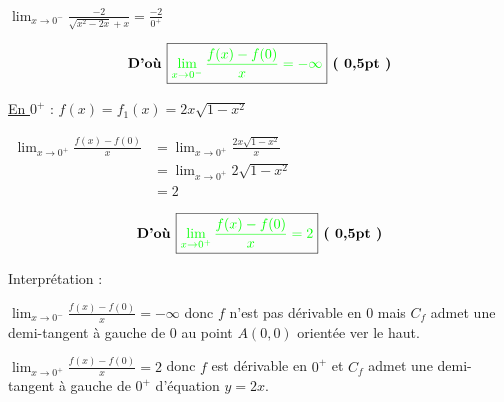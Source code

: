 \documentclass[12pt,a4paper]{article}
\begin{document}
\begin{enumerate}
$\lim_{x \to 0^{-}} \frac{ - 2}{\sqrt{x^2 - 2x}+x}=\frac{-2}{0^{+}}$

\[\textbf{D'où } \boxed{\textcolor{green}{ \lim_{x \to 0^{-}} \frac{f(x)-f(0)}{x} = -\infty }} \textbf{ ( 0,5pt )} \]

\underline{En \( 0^{+} \)} : \( f(x) = f_{1}(x) = 2x\sqrt{ 1 - x^2 } \)

$
\begin{aligned}
\lim_{x \to 0^{+}} \frac{f(x)-f(0)}{x} &= \lim_{x \to 0^{+}} \frac{2x\sqrt{ 1 - x^2 }}{x}\\
																			 &=  \lim_{x \to 0^{+}} 2\sqrt{ 1 - x^2 }\\
																			 &= 2
\end{aligned}
$

\[\textbf{D'où } \boxed{\textcolor{green}{ \lim_{x \to 0^{+}} \frac{f(x)-f(0)}{x} = 2 }} \textbf{ ( 0,5pt )} \]

Interprétation : 

$ \lim_{x \to 0^{-}} \frac{f(x)-f(0)}{x} = -\infty $ donc $f$ n'est pas dérivable en $0$  mais $C_{f}$ admet une demi-tangent à gauche de $0$ au point $A(0,0)$ orientée ver le haut.

$ \lim_{x \to 0^{+}} \frac{f(x)-f(0)}{x} = 2 $ donc $f$ est dérivable en $0^{+}$  et $C_{f}$ admet une demi-tangent à gauche de $0^{+}$ d'équation $ y = 2x$.
\end{enumerate}
\end{document}
